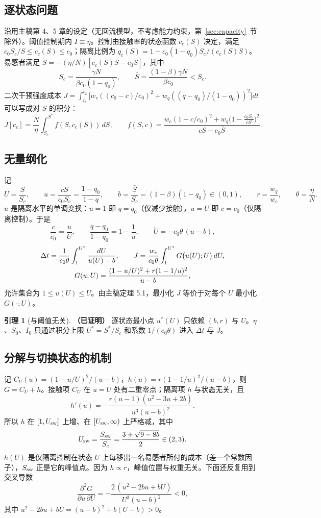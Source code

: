 \documentclass[11pt,a4paper]{ctexart}
\theoremstyle{definition}
\newtheorem{lemma}[theorem]{引理}
\theoremstyle{definition}
\newcommand{\Usw}{U_{\rm sw}}
\newcommand{\Ssw}{S_{\rm sw}}
\newcommand{\proven}{\textbf{（已证明）}}
\begin{document}
\subsection{逐状态问题}
沿用主稿第 4、5 章的设定（无回流模型，不考虑能力约束，第~\ref{sec:capacity}~节除外）。阈值控制期内 $I\equiv\eta$。控制由接触率的状态函数 $c_c(S)$ 决定，满足 $c_0S_c/S\le c_c(S)\le c_0$；隔离比例为 $q_c(S)=1-c_0(1-q_0)S_c/(c_c(S)S)$。易感者满足 $\dot S=-(\eta/N)[c_c(S)S-c_0\bar S]$，其中
\[
S_c=\frac{\gamma N}{\beta c_0(1-q_0)},\qquad \bar S=\frac{(1-\beta)\gamma N}{\beta c_0}<S_c .
\]
二次干预强度成本 $J=\int_{t_1}^{t_2}\bigl[w_c((c_0-c)/c_0)^2+w_q((q-q_0)/(1-q_0))^2\bigr]dt$ 可以写成对 $S$ 的积分：
\[
J[c_c]=\frac{N}{\eta}\int_{S_c}^{S^*}f(S,c_c(S))\,dS ,\qquad f(S,c)=\frac{w_c(1-c/c_0)^2+w_q\bigl(1-\frac{c_0S_c}{cS}\bigr)^2}{cS-c_0\bar S}.
\]

\subsection{无量纲化}
记
\[
U=\frac{S}{S_c},\qquad u=\frac{cS}{c_0S_c}=\frac{1-q_0}{1-q},\qquad b=\frac{\bar S}{S_c}=(1-\beta)(1-q_0)\in(0,1),\qquad r=\frac{w_q}{w_c},\qquad \theta=\frac{\eta}{N}.
\]
$u$ 是隔离水平的单调变换：$u=1$ 即 $q=q_0$（仅减少接触），$u=U$ 即 $c=c_0$（仅隔离控制）。于是
\[
\frac{c}{c_0}=\frac uU,\qquad \frac{q-q_0}{1-q_0}=1-\frac1u,\qquad \dot U=-c_0\theta\,(u-b),
\]
\begin{gather}
\Delta t=\frac{1}{c_0\theta}\int_1^{U^*}\frac{dU}{u(U)-b},\qquad
J=\frac{w_c}{c_0\theta}\int_1^{U^*}G\bigl(u(U);U\bigr)\,dU,\notag\\
G(u;U)=\frac{(1-u/U)^2+r(1-1/u)^2}{u-b},
\label{eq:G}
\end{gather}
允许集合为 $1\le u(U)\le U$。由主稿定理 5.1，最小化 $J$ 等价于对每个 $U$ 最小化 $G(\cdot;U)$。

\begin{lemma}[与阈值无关]\label{lem:invariance}\proven
逐状态最小点 $u^*(U)$ 只依赖 $(b,r)$ 与 $U$。$\eta$、$S_0$、$I_0$ 只通过积分上限 $U^*=S^*/S_c$ 和系数 $1/(c_0\theta)$ 进入 $\Delta t$ 与 $J$。
\end{lemma}

\subsection{分解与切换状态的机制}
记 $C_U(u)=(1-u/U)^2/(u-b)$，$h(u)=r(1-1/u)^2/(u-b)$，则 $G=C_U+h$。接触项 $C_U$ 在 $u=U$ 处有二重零点；隔离项 $h$ 与状态无关，且
\begin{equation}
h'(u)=-\frac{r(u-1)(u^2-3u+2b)}{u^3(u-b)^2}.
\label{eq:hprime}
\end{equation}
所以 $h$ 在 $[1,\Usw]$ 上增、在 $[\Usw,\infty)$ 上严格减，其中
\[
\Usw=\frac{\Ssw}{S_c}=\frac{3+\sqrt{9-8b}}{2}\in(2,3).
\]
$h(U)$ 是仅隔离控制在状态 $U$ 上每移出一名易感者所付的成本（差一个常数因子），$\Ssw$ 正是它的峰值点。因为 $h\propto r$，峰值位置与权重无关。下面还反复用到交叉导数
\begin{equation}
\frac{\partial^2G}{\partial u\,\partial U}=-\frac{2\,(u^2-2bu+bU)}{U^3(u-b)^2}<0 ,
\label{eq:cross}
\end{equation}
其中 $u^2-2bu+bU=(u-b)^2+b(U-b)>0$。
\end{document}
